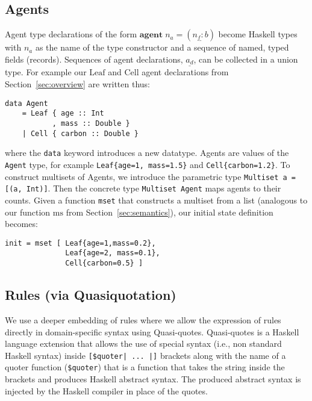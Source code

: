 \documentclass[phd]{infthesis}
\newcommand{\s}[1]{\underline{#1}}
\newcommand{\ms}{\mathrm{ms}}
\begin{document}
\subsection{Agents}
Agent type declarations of the form $\mathbf{agent} \; n_a = (\s{n_f : b})$
become Haskell types with $n_a$ as the name of the type constructor and a
sequence of named, typed fields (records). Sequences of agent declarations,
$\s{a_d}$, can be collected in a union type. For example our $\mathrm{Leaf}$ and
$\mathrm{Cell}$ agent declarations from Section~\ref{sec:overview} are written
thus:
\begin{center}
\begin{BVerbatim}
data Agent
    = Leaf { age :: Int
           , mass :: Double }
    | Cell { carbon :: Double }
\end{BVerbatim}
\end{center}
where the \texttt{data} keyword introduces a new datatype.  Agents are values of
the \texttt{Agent} type, for example \texttt{Leaf\{age=1, mass=1.5\}} and
\texttt{Cell\{carbon=1.2\}}.  To construct multisets of Agents, we introduce the
parametric type \texttt{Multiset a = [(a, Int)]}.  Then the concrete type
\texttt{Multiset Agent} maps agents to their counts.
Given a function \texttt{mset} that constructs a multiset from a list (analogous to our function $\ms$ from Section~\ref{sec:semantics}),
our initial state definition becomes:
\begin{center}
\begin{BVerbatim}
init = mset [ Leaf{age=1,mass=0.2}, 
              Leaf{age=2, mass=0.1}, 
              Cell{carbon=0.5} ]
\end{BVerbatim}
\end{center}


\subsection{Rules (via Quasiquotation)}
\label{sec:ruleQQ}
We use a deeper embedding of rules where we allow the expression of rules
directly in domain-specific syntax using Quasi-quotes. Quasi-quotes is a Haskell
language extension that allows the use of special syntax (i.e., non standard
Haskell syntax) inside \texttt{[\$quoter| ... |]} brackets along with the name
of a quoter function (\texttt{\$quoter}) that is a function that takes the
string inside the brackets and produces Haskell abstract syntax. The produced
abstract syntax is injected by the Haskell compiler in place of the quotes.
\end{document}
